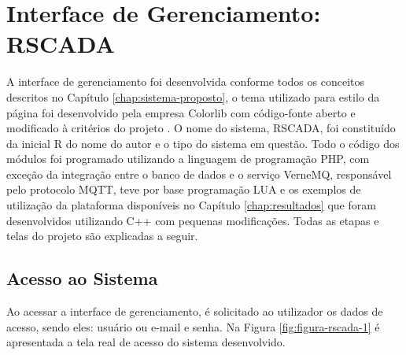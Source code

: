 \chapter{Interface de Gerenciamento: RSCADA}
\label{chap:interface-web}

A interface de gerenciamento foi desenvolvida conforme todos os conceitos descritos no Capítulo \ref{chap:sistema-proposto}, o tema utilizado para estilo da página foi desenvolvido pela empresa Colorlib com código-fonte aberto e modificado à critérios do projeto \cite{Concept}. O nome do sistema, RSCADA,  foi constituído da inicial R do nome do autor e o tipo do sistema em questão. Todo o código dos módulos foi programado utilizando a linguagem de programação PHP, com exceção da integração entre o banco de dados e o serviço VerneMQ, responsável pelo protocolo MQTT, teve por base programação LUA e os exemplos de utilização da plataforma disponíveis no Capítulo \ref{chap:resultados} que foram desenvolvidos utilizando C++ com pequenas modificações. Todas as etapas e telas do projeto são explicadas a seguir.

\section{Acesso ao Sistema}
\label{sec:acesso-sistema}
Ao acessar a interface de gerenciamento, é solicitado ao utilizador os dados de acesso, sendo eles: usuário ou e-mail e senha. Na Figura \ref{fig:figura-rscada-1} é apresentada a tela real de acesso do sistema desenvolvido.

        \begin{figure}[!h]
    	\end{figure}

